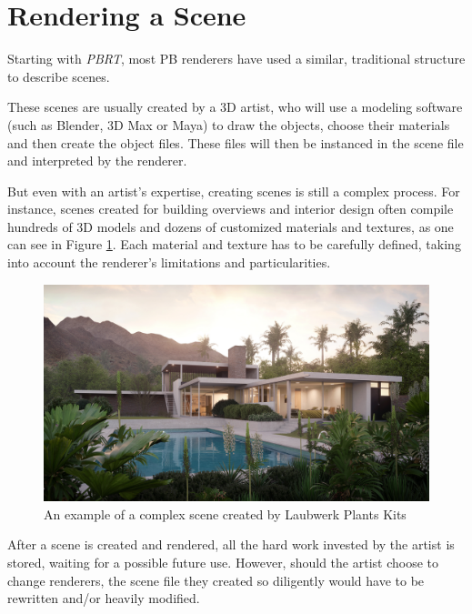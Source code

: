 \documentclass[cic,tc,english]{iiufrgs}
\begin{document}
\section{Rendering a Scene}
Starting with \textit{PBRT}, most PB renderers have used a similar, traditional​ structure to describe scenes.

These scenes are usually created by a 3D artist, who will use a modeling software (such as Blender, 3D Max or Maya) to draw the objects, choose their materials and then create the object files. These files will then be instanced in the scene file and interpreted by the renderer.

But even with an artist’s expertise, creating scenes is still a complex process. For instance, scenes created for building overviews and interior design often compile hundreds of 3D models and dozens of customized materials and textures, as one can see in Figure \ref{fig:intro_complexScene}. Each material and texture has to be carefully defined, taking into account the renderer's limitations and particularities.

\begin{figure}[h]
  
\includegraphics[width=\textwidth,height=\textheight,keepaspectratio]{../images/1_introduction/Laubwerk-Kit-12_Bauclassroom-Exterior}
  \caption{An example of a complex scene created by Laubwerk Plants Kits}
  \label{fig:intro_complexScene}
\end{figure}

After a scene is created and rendered, all the hard work invested by the artist is stored, waiting for a possible future use. However, should the artist choose to change renderers, the scene file they created so diligently would have to be rewritten and/or heavily modified.
\end{document}
